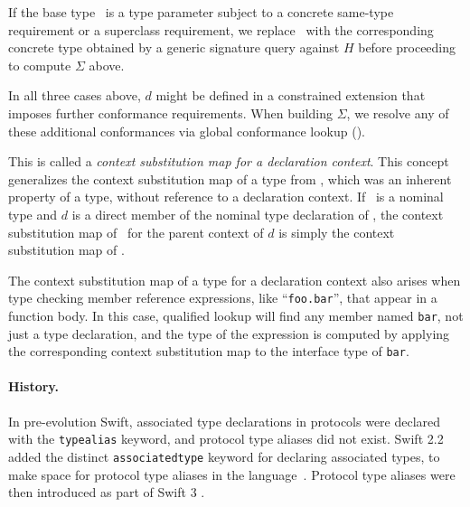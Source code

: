 \documentclass[../generics]{subfiles}
\begin{document}
If the base type \tT\ is a type parameter subject to a concrete same-type requirement or a superclass requirement, we replace \tT\ with the corresponding concrete type obtained by a generic signature query against $H$ before proceeding to compute $\Sigma$ above.

In all three cases above, $d$ might be defined in a constrained extension that imposes further conformance requirements. When building $\Sigma$, we resolve any of these additional conformances via global conformance lookup ().

This is called a  \emph{context substitution map for a declaration context}. This concept generalizes the context substitution map of a type from , which was an inherent property of a type, without reference to a declaration context. If \tT\ is a nominal type and $d$ is a direct member of the nominal type declaration of \tT, the context substitution map of \tT\ for the parent context of $d$ is simply the context substitution map of \tT.

The context substitution map of a type for a declaration context also arises when type checking member reference expressions, like ``\texttt{foo.bar}'', that appear in a function body. In this case, qualified lookup will find any member named \texttt{bar}, not just a type declaration, and the type of the expression is computed by applying the corresponding context substitution map to the interface type of \texttt{bar}.

\paragraph{History.} In pre-evolution Swift, associated type declarations in protocols were declared with the \texttt{typealias} keyword, and protocol type aliases did not exist. Swift 2.2 added the distinct \texttt{associatedtype} keyword for declaring associated types, to make space for protocol type aliases in the language~\cite{se0011}. Protocol type aliases were then introduced as part of Swift 3 \cite{se0092}.
\end{document}
